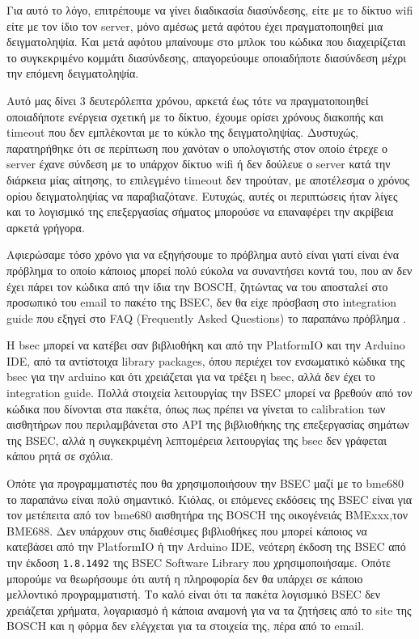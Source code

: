 Για αυτό το λόγο, επιτρέπουμε να γίνει διαδικασία διασύνδεσης, είτε με το δίκτυο wifi είτε με τον ίδιο τον server, μόνο αμέσως μετά αφότου έχει πραγματοποιηθεί μια δειγματοληψία.
Και μετά αφότου μπαίνουμε στο μπλοκ του κώδικα που διαχειρίζεται το συγκεκριμένο κομμάτι διασύνδεσης, απαγορεύουμε οποιαδήποτε διασύνδεση μέχρι την επόμενη δειγματοληψία.

Αυτό μας δίνει 3 δευτερόλεπτα χρόνου, αρκετά έως τότε να πραγματοποιηθεί οποιαδήποτε ενέργεια σχετική με το δίκτυο, έχουμε ορίσει χρόνους διακοπής και timeout που δεν εμπλέκονται με το κύκλο της δειγματοληψίας. 
Δυστυχώς, παρατηρήθηκε ότι σε περίπτωση που χανόταν ο υπολογιστής στον οποίο έτρεχε ο server έχανε σύνδεση με το υπάρχον δίκτυο wifi ή δεν δούλευε ο server κατά την διάρκεια μίας αίτησης,
το επιλεγμένο timeout δεν τηρούταν, με αποτέλεσμα ο χρόνος ορίου δειγματοληψίας να παραβιαζότανε. 
Ευτυχώς, αυτές οι περιπτώσεις ήταν λίγες και το λογισμικό της επεξεργασίας σήματος μπορούσε να επαναφέρει την ακρίβεια αρκετά γρήγορα.



Αφιερώσαμε τόσο χρόνο για να εξηγήσουμε το πρόβλημα αυτό είναι γιατί είναι ένα πρόβλημα το οποίο κάποιος μπορεί πολύ εύκολα να συναντήσει κοντά του,
που αν δεν έχει πάρει τον κώδικα από την ίδια την BOSCH, ζητώντας να του αποσταλεί στο προσωπικό του email το πακέτο της BSEC, 
δεν θα είχε πρόσβαση στο integration guide που εξηγεί στο FAQ (Frequently Asked Questions) το παραπάνω πρόβλημα \cite{bsecDownload}.

Η bsec μπορεί να κατέβει σαν βιβλιοθήκη και από την PlatformIO και την Arduino IDE, από τα αντίστοιχα library packages,
όπου περιέχει τον ενσωματικό κώδικα της bsec για την arduino και ότι χρειάζεται για να τρέξει η bsec, αλλά δεν έχει το integration guide.
Πολλά στοιχεία λειτουργίας την BSEC μπορεί να βρεθούν από τον κώδικα που δίνονται στα πακέτα, 
όπως πως πρέπει να γίνεται το calibration των αισθητήρων που περιλαμβάνεται στο API της βιβλιοθήκης της επεξεργασίας σημάτων της BSEC,
αλλά η συγκεκριμένη λεπτομέρεια λειτουργίας της bsec δεν γράφεται κάπου ρητά σε σχόλια.

Οπότε για προγραμματιστές που θα χρησιμοποιήσουν την BSEC μαζί με το bme680 το παραπάνω είναι πολύ σημαντικό.
Κιόλας, οι επόμενες εκδόσεις της BSEC είναι για τον μετέπειτα από τον bme680 αισθητήρα της BOSCH της οικογένειάς BMExxx,τον BME688.
Δεν υπάρχουν στις διαθέσιμες βιβλιοθήκες που μπορεί κάποιος να κατεβάσει από την PlatformIO ή την Arduino IDE, νεότερη έκδοση της BSEC 
από την έκδοση \texttt{1.8.1492} της BSEC Software Library που χρησιμοποιήσαμε.
Οπότε μπορούμε να θεωρήσουμε ότι αυτή η πληροφορία δεν θα υπάρχει σε κάποιο μελλοντικό προγραμματιστή. 
Το καλό είναι ότι τα πακέτα λογισμικό BSEC δεν χρειάζεται χρήματα, λογαριασμό ή κάποια αναμονή για να τα ζητήσεις από το site της BOSCH και η φόρμα δεν ελέγχεται για τα στοιχεία της, πέρα από το email.

